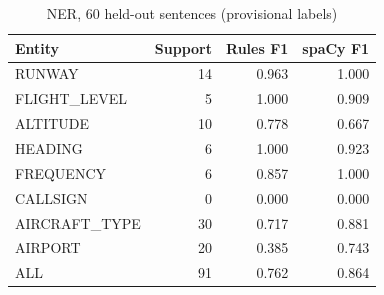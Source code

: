 \begin{table}[t]
\centering
\caption{NER, 60 held-out sentences (provisional labels)}
\label{tab:ner}
\begin{tabular}{lrrr}
\toprule
Entity & Support & Rules F1 & spaCy F1 \\
\midrule
RUNWAY & 14 & 0.963 & 1.000 \\
FLIGHT\_LEVEL & 5 & 1.000 & 0.909 \\
ALTITUDE & 10 & 0.778 & 0.667 \\
HEADING & 6 & 1.000 & 0.923 \\
FREQUENCY & 6 & 0.857 & 1.000 \\
CALLSIGN & 0 & 0.000 & 0.000 \\
AIRCRAFT\_TYPE & 30 & 0.717 & 0.881 \\
AIRPORT & 20 & 0.385 & 0.743 \\
ALL & 91 & 0.762 & 0.864 \\
\bottomrule
\end{tabular}
\end{table}
